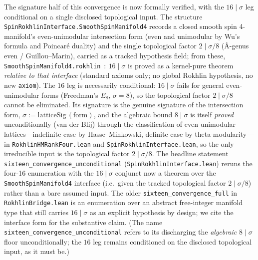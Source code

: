 \documentclass[aps,prl,twocolumn,superscriptaddress]{revtex4-2}
\begin{document}
The signature half of this convergence is now formally verified, with the
$16 \mid \sigma$ leg conditional on a single disclosed topological input.
The structure
\texttt{SpinRokhlinInterface.SmoothSpinManifold4} records a closed smooth
spin 4-manifold's even-unimodular intersection form (even and unimodular
by Wu's formula and Poincar\'e duality) and the single topological factor
$2 \mid \sigma/8$ (\^A-genus even / Guillou--Marin), carried as a tracked
hypothesis field; from these,
\texttt{SmoothSpinManifold4.rokhlin}~$:~16 \mid \sigma$ is proved as a
kernel-pure theorem \emph{relative to that interface} (standard axioms
only; no global Rokhlin hypothesis, no new \texttt{axiom}). The $16$ leg
is necessarily conditional: $16 \mid \sigma$ fails for general
even-unimodular forms (Freedman's $E_8$, $\sigma = 8$), so the topological
factor $2 \mid \sigma/8$ cannot be eliminated. Its signature is the
genuine signature of the
intersection form, $\sigma := \mathrm{latticeSig}\,(\text{form})$, and the
algebraic bound $8 \mid \sigma$ is itself \emph{proved} unconditionally
(van der Blij)
through the classification of even unimodular lattices---indefinite case by
Hasse--Minkowski, definite case by theta-modularity---in
\texttt{RokhlinHMRankFour.lean} and \texttt{SpinRokhlinInterface.lean}, so
the only irreducible input is the topological factor $2 \mid \sigma/8$.
The headline statement
\texttt{sixteen\_convergence\_unconditional}
(\texttt{SpinRokhlinInterface.lean}) reruns the four-16 enumeration with
the $16 \mid \sigma$ conjunct now a theorem over the
\texttt{SmoothSpinManifold4} interface (i.e.\ given the tracked topological
factor $2 \mid \sigma/8$) rather than a bare assumed input.
The older \texttt{sixteen\_convergence\_full} in
\texttt{RokhlinBridge.lean} is an enumeration over an abstract free-integer
manifold type that still carries $16 \mid \sigma$ as an explicit hypothesis
by design; we cite the interface form for the substantive claim. (The name
\texttt{sixteen\_convergence\_unconditional} refers to its discharging the
\emph{algebraic} $8 \mid \sigma$ floor unconditionally; the $16$ leg
remains conditioned on the disclosed topological input, as it must be.)
\end{document}
